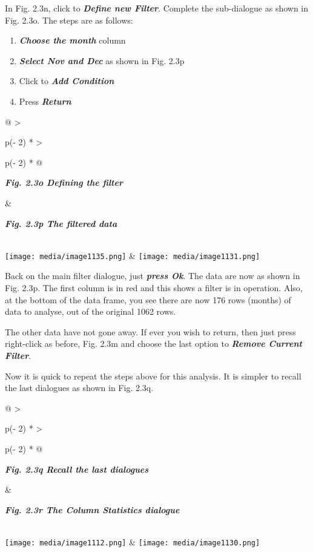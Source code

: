 \documentclass[
  letterpaper,
  DIV=11,
  numbers=noendperiod]{scrreprt}
\begin{document}
In Fig. 2.3n, click to \textbf{\emph{Define new Filter}}. Complete the
sub-dialogue as shown in Fig. 2.3o. The steps are as follows:

\begin{enumerate}
\def\labelenumi{\arabic{enumi})}
\item
  \textbf{\emph{Choose the month}} column
\item
  \textbf{\emph{Select Nov and Dec}} as shown in Fig. 2.3p
\item
  Click to \textbf{\emph{Add Condition}}
\item
  Press \textbf{\emph{Return}}
\end{enumerate}

\begin{longtable}[]{@{}
  >{\raggedright\arraybackslash}p{(\columnwidth - 2\tabcolsep) * }
  >{\raggedright\arraybackslash}p{(\columnwidth - 2\tabcolsep) * }@{}}
\toprule\noalign{}
\begin{minipage}[b]{\linewidth}\raggedright
\textbf{\emph{Fig. 2.3o Defining the filter}}
\end{minipage} & \begin{minipage}[b]{\linewidth}\raggedright
\textbf{\emph{Fig. 2.3p The filtered data}}
\end{minipage} \\
\midrule\noalign{}
\endhead
\bottomrule\noalign{}
\endlastfoot
\texttt{[image: media/image1135.png]}
&
\texttt{[image: media/image1131.png]} \\
\end{longtable}

Back on the main filter dialogue, just \textbf{\emph{press Ok}}. The
data are now as shown in Fig. 2.3p. The first column is in red and this
shows a filter is in operation. Also, at the bottom of the data frame,
you see there are now 176 rows (months) of data to analyse, out of the
original 1062 rows.

The other data have not gone away. If ever you wish to return, then just
press right-click as before, Fig. 2.3m and choose the last option to
\textbf{\emph{Remove Current Filter}}.

Now it is quick to repeat the steps above for this analysis. It is
simpler to recall the last dialogues as shown in Fig. 2.3q.

\begin{longtable}[]{@{}
  >{\raggedright\arraybackslash}p{(\columnwidth - 2\tabcolsep) * }
  >{\raggedright\arraybackslash}p{(\columnwidth - 2\tabcolsep) * }@{}}
\toprule\noalign{}
\begin{minipage}[b]{\linewidth}\raggedright
\textbf{\emph{Fig. 2.3q Recall the last dialogues}}
\end{minipage} & \begin{minipage}[b]{\linewidth}\raggedright
\textbf{\emph{Fig. 2.3r The Column Statistics dialogue}}
\end{minipage} \\
\midrule\noalign{}
\endhead
\bottomrule\noalign{}
\endlastfoot
\texttt{[image: media/image1112.png]}
&
\texttt{[image: media/image1130.png]} \\
\end{longtable}
\end{document}
